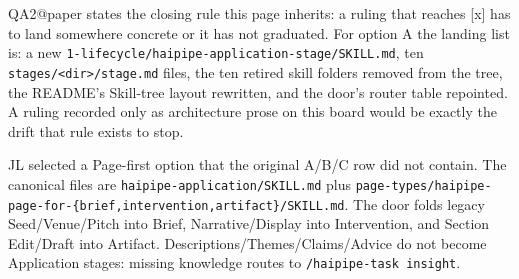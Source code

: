 QA2@paper states the closing rule this page inherits: a ruling that reaches [x] has to land somewhere concrete or it has not graduated. For option A the landing list is: a new \texttt{1-lifecycle/haipipe-application-stage/SKILL.md}, ten \texttt{stages/<dir>/stage.md} files, the ten retired skill folders removed from the tree, the README's Skill-tree layout rewritten, and the door's router table repointed. A ruling recorded only as architecture prose on this board would be exactly the drift that rule exists to stop.

JL selected a Page-first option that the original A/B/C row did not contain. The canonical files are \texttt{haipipe-application/SKILL.md} plus \texttt{page-types/haipipe-page-for-\{brief,intervention,artifact\}/SKILL.md}. The door folds legacy Seed/Venue/Pitch into Brief, Narrative/Display into Intervention, and Section Edit/Draft into Artifact. Descriptions/Themes/Claims/Advice do not become Application stages: missing knowledge routes to \texttt{/haipipe-task insight}.

